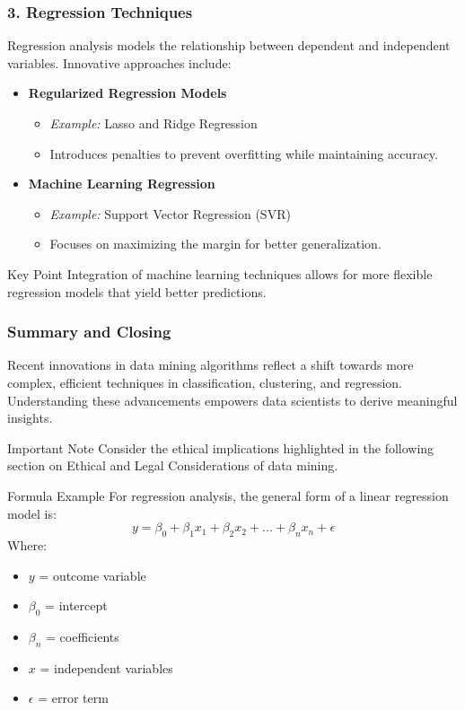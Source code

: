 \documentclass{beamer}
\begin{document}
\begin{frame}[fragile]
    \frametitle{3. Regression Techniques}
    Regression analysis models the relationship between dependent and independent variables. Innovative approaches include:
    \begin{itemize}
        \item \textbf{Regularized Regression Models}
        \begin{itemize}
            \item \textit{Example:} Lasso and Ridge Regression
            \item Introduces penalties to prevent overfitting while maintaining accuracy.
        \end{itemize}
        \item \textbf{Machine Learning Regression}
        \begin{itemize}
            \item \textit{Example:} Support Vector Regression (SVR)
            \item Focuses on maximizing the margin for better generalization.
        \end{itemize}
    \end{itemize}
    \begin{block}{Key Point}
        Integration of machine learning techniques allows for more flexible regression models that yield better predictions.
    \end{block}
\end{frame}

\begin{frame}[fragile]
    \frametitle{Summary and Closing}
    Recent innovations in data mining algorithms reflect a shift towards more complex, efficient techniques in classification, clustering, and regression. Understanding these advancements empowers data scientists to derive meaningful insights.

    \begin{block}{Important Note}
        Consider the ethical implications highlighted in the following section on Ethical and Legal Considerations of data mining.
    \end{block}
    
    \begin{block}{Formula Example}
        For regression analysis, the general form of a linear regression model is:
        \begin{equation}
            y = \beta_0 + \beta_1x_1 + \beta_2x_2 + ... + \beta_nx_n + \epsilon
        \end{equation}
        Where:
        \begin{itemize}
            \item $y$ = outcome variable
            \item $\beta_0$ = intercept
            \item $\beta_n$ = coefficients
            \item $x$ = independent variables
            \item $\epsilon$ = error term
        \end{itemize}
    \end{block}
\end{frame}
\end{document}
